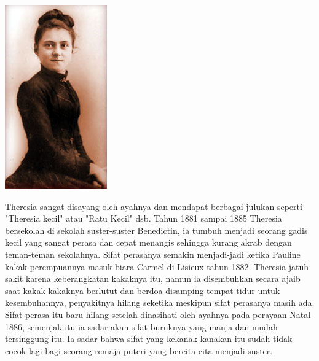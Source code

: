 \begin{floatingfigure}[l]{2.75cm}
\begin{center}
\includegraphics[scale=0.5]{theresia-1.jpg}
\end{center}
\end{floatingfigure}
Theresia sangat disayang oleh ayahnya dan mendapat berbagai julukan seperti "Theresia kecil" atau "Ratu Kecil" dsb. Tahun 1881 sampai 1885 Theresia bersekolah di sekolah suster-suster Benedictin, ia tumbuh menjadi seorang gadis kecil yang sangat perasa dan cepat menangis sehingga kurang akrab dengan teman-teman sekolahnya. Sifat perasanya semakin menjadi-jadi ketika Pauline kakak perempuannya masuk biara Carmel di Lisieux tahun 1882. Theresia jatuh sakit karena keberangkatan kakaknya itu, namun ia disembuhkan secara ajaib saat kakak-kakaknya berlutut dan berdoa disamping tempat tidur untuk kesembuhannya, penyakitnya hilang seketika meskipun sifat perasanya masih ada. Sifat perasa itu baru hilang setelah dinasihati oleh ayahnya pada perayaan Natal 1886, semenjak itu ia sadar akan sifat buruknya yang manja dan mudah tersinggung itu. Ia sadar bahwa sifat yang kekanak-kanakan itu sudah tidak cocok lagi bagi seorang remaja puteri yang bercita-cita menjadi suster.

